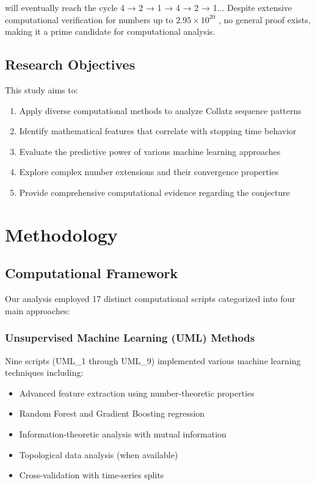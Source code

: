 \documentclass[12pt,a4paper]{article}
\begin{document}
will eventually reach the cycle 4 → 2 → 1 → 4 → 2 → 1... Despite extensive computational verification for numbers up to $2.95 \times 10^{20}$ \cite{oliveira2019}, no general proof exists, making it a prime candidate for computational analysis.

\subsection{Research Objectives}

This study aims to:
\begin{enumerate}
\item Apply diverse computational methods to analyze Collatz sequence patterns
\item Identify mathematical features that correlate with stopping time behavior
\item Evaluate the predictive power of various machine learning approaches
\item Explore complex number extensions and their convergence properties
\item Provide comprehensive computational evidence regarding the conjecture
\end{enumerate}

\section{Methodology}

\subsection{Computational Framework}

Our analysis employed 17 distinct computational scripts categorized into four main approaches:

\subsubsection{Unsupervised Machine Learning (UML) Methods}
Nine scripts (UML\_1 through UML\_9) implemented various machine learning techniques including:
\begin{itemize}
\item Advanced feature extraction using number-theoretic properties
\item Random Forest and Gradient Boosting regression
\item Information-theoretic analysis with mutual information
\item Topological data analysis (when available)
\item Cross-validation with time-series splits
\end{itemize}
\end{document}

